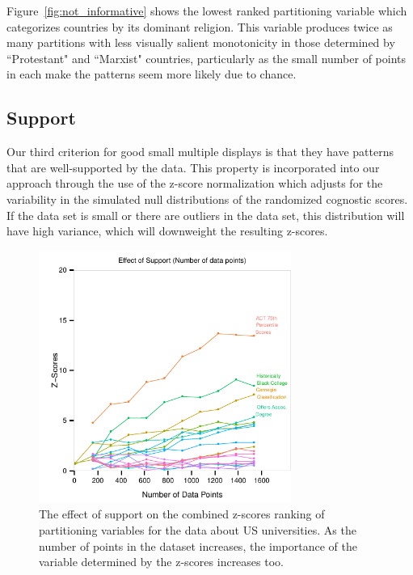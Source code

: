 Figure~\ref{fig:not_informative} shows the lowest ranked partitioning variable which categorizes countries by its dominant religion. This variable produces twice as many partitions with less visually salient monotonicity in those determined by ``Protestant" and ``Marxist" countries, particularly as the small number of points in each make the patterns seem more likely due to chance. %



\subsection{Support}
Our third criterion for good small multiple displays is that they have patterns that are well-supported by the data. This property is incorporated into our approach through the use of the z-score normalization which adjusts for the variability in the simulated null distributions of the randomized cognostic scores. If the data set is small or there are outliers in the data set, this distribution will have high variance, which will downweight the resulting z-scores.

\begin{figure}
\centering
\includegraphics[width=3.25in,height=3.25in]{images/support-nogrid.pdf}
  \caption{The effect of support on the combined z-scores ranking of partitioning variables for the data about US universities. As the number of points in the dataset increases, the importance of the variable determined by the z-scores increases too. }
 \label{fig:support}
\end{figure}


